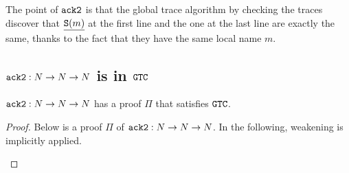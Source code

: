 The point of ${\tt ack2}$ is that the global trace algorithm by checking the
traces discover that $\underline{{\tt S}(m)}$ 
at the first line and the one at the last line are exactly the same, thanks to the fact that
they have the same local name $m$.




\subsection{${\tt ack2}:{N}\to{N}\to{N}$ is in ${\tt GTC}$}

\begin{proposition}
  ${\tt ack2}:{N}\to{N}\to{N}$ has a proof $\Pi$ that satisfies ${\tt GTC}$.
\end{proposition}

\begin{proof}
Below is a proof $\Pi$ of ${\tt ack2}:{N}\to{N}\to{N}$. 
In the following, weakening is implicitly applied. 


\begin{flushright}


\end{flushright}
\end{proof}
